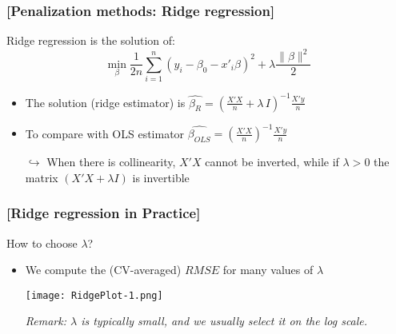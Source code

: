\documentclass[xcolor=x11names,compress, aspectratio=169]{beamer}
\renewcommand{\(}{\begin{columns}}
\renewcommand{\)}{\end{columns}}
\newcommand{\<}[1]{\begin{column}{#1}}
\renewcommand{\>}{\end{column}}
\begin{document}
\begin{frame} %
\frametitle{\textcolor{brique}{[Penalization methods: Ridge regression]}}
Ridge regression is  the solution of:
$$
\min_{\beta} \frac{1}{2n}
\sum_{i=1}^{n}{ \left( y_i - \beta_0 - x'_i\beta\right)^{2} } +
\lambda \frac{\| \beta\|^{2}}{2}
$$
\pause
\begin{itemize}[<+->]
\item The solution (ridge estimator) is $\widehat{\beta_R} = \left( \frac{X'X}{n} + \lambda \, I \right)^{-1} \frac{X' y}{n}$
\item To compare with OLS estimator  $ \widehat{\beta_{OLS}} = \left( \frac{X'X}{n}\right)^{-1} \frac{X' y}{n} $
\item[$\hookrightarrow$] When there is collinearity, $X'X$ cannot be inverted, while if $\lambda >0$ the matrix $ \left( X'X + \lambda I \right)$ is invertible
\end{itemize}
\end{frame}

\begin{frame} %
\frametitle{\textcolor{brique}{[Ridge regression in Practice]}}
How to choose $\lambda$?
\pause
\begin{itemize}[<+->]
\item We compute the (CV-averaged) $RMSE$ for many values of $\lambda$
\item[]  \texttt{[image: RidgePlot-1.png]}
\item[]\emph{Remark: $\lambda$ is typically small, and we usually select it on the log scale.}
\end{itemize}
\end{frame}

\end{document}
